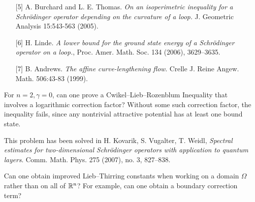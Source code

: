 \documentclass[12pt,letterpaper, reqno]{amsart}
\begin{document}
\begin{problemblock}
\begin{itemize}
\item[{[5]}] A. Burchard and L. E. Thomas. \emph{On an isoperimetric inequality
for a Schr\"odinger operator depending on the curvature of a loop.}
J. Geometric Analysis 15:543-563 (2005).

\item[{[6]}] H. Linde. \emph{A lower bound for the ground state energy of a
Schr\"odinger operator on a loop.},
Proc. Amer. Math. Soc. 134 (2006), 3629--3635.


\item[{[7]}]  B. Andrews. \emph{The affine curve-lengthening flow.}
Crelle J. Reine Angew. Math. 506:43-83 (1999).

\end{itemize}
\end{problemblock}

\begin{problemblock}


\begin{problem}
 For $n=2, \gamma=0$, can one
prove a Cwikel--Lieb--Rozenblum Inequality that involves a
logarithmic correction factor? Without some such correction factor,
the inequality fails, since any nontrivial attractive potential has
at least one bound state.
\end{problem}

 This problem has been solved in H. Kovarik, S. Vugalter, T. Weidl, \emph{Spectral estimates for two-dimensional Schr\"odinger operators with application to quantum layers}. Comm. Math. Phys. 275 (2007), no. 3, 827--838.

\end{problemblock}


\begin{problem}
 Can one obtain improved
Lieb--Thirring constants when working on a domain $\Omega$ rather
than on all of $\mathbb R^n$? For example, can one obtain a boundary
correction term?
\end{problem}
\end{document}
